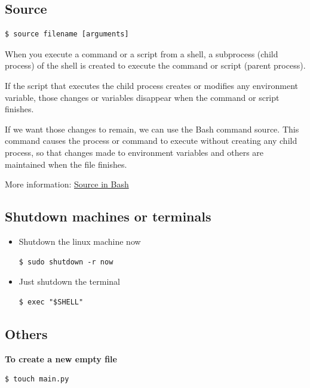 \documentclass{article}
\newenvironment{codetemplate}[1][]{%
  \mybasecolorbox[#1]
  \itshape
}{%
  \endmybasecolorbox
}
\begin{document}
\subsection{Source}
\begin{codetemplate}
\begin{verbatim}
$ source filename [arguments]
\end{verbatim}
\end{codetemplate}

When you execute a command or a script from a shell, a subprocess (child process) of the shell is created to execute the command or script (parent process).

If the script that executes the child process creates or modifies any environment variable, those changes or variables disappear when the command or script finishes.

If we want those changes to remain, we can use the Bash command source. This command causes the process or command to execute without creating any child process, so that changes made to environment variables and others are maintained when the file finishes.

More information: \url{Source in Bash}

\subsection{Shutdown machines or terminals}
\begin{itemize}
    \item Shutdown the linux machine now
\begin{codetemplate}{}
\begin{verbatim}
$ sudo shutdown -r now
\end{verbatim}
\end{codetemplate}

    \item Just shutdown the terminal
\begin{codetemplate}{}
\begin{verbatim}
$ exec "$SHELL"
\end{verbatim}
\end{codetemplate}
\end{itemize}

\subsection{Others}
\textbf{To create a new empty file}
\begin{codetemplate}{}
\begin{verbatim}
$ touch main.py
\end{verbatim}
\end{codetemplate}
\end{document}

